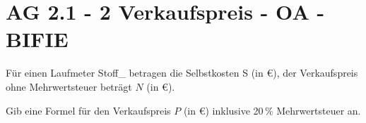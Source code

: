 \section{AG 2.1 - 2 Verkaufspreis - OA - BIFIE}

\begin{beispiel}[AG 2.1]{1} %
Für einen Laufmeter Stoff_ betragen die Selbstkosten S (in \euro), der Verkaufspreis ohne Mehrwertsteuer beträgt $N$ (in \euro).

Gib eine Formel für den Verkaufspreis $P$ (in \euro) inklusive 20\,\% Mehrwertsteuer an.


\end{beispiel}